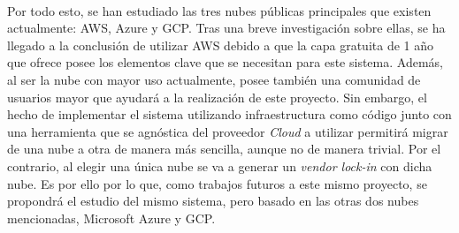 \documentclass[../../memoria.tex]{subfiles}
\begin{document}
\paragraph{}
Por todo esto, se han estudiado las tres nubes públicas principales que existen actualmente: AWS, Azure y GCP. Tras una breve investigación sobre ellas, se ha llegado a la conclusión de utilizar AWS debido a que la capa gratuita de 1 año que ofrece posee los elementos clave que se necesitan para este sistema. Además, al ser la nube con mayor uso actualmente, posee también una comunidad de usuarios mayor que ayudará a la realización de este proyecto. Sin embargo, el hecho de implementar el sistema utilizando infraestructura como código junto con una herramienta que se agnóstica del proveedor \textit{Cloud} a utilizar permitirá migrar de una nube a otra de manera más sencilla, aunque no de manera trivial. Por el contrario, al elegir una única nube se va a generar un \textit{vendor lock-in} con dicha nube. Es por ello por lo que, como trabajos futuros a este mismo proyecto, se propondrá el estudio del mismo sistema, pero basado en las otras dos nubes mencionadas, Microsoft Azure y GCP.
\end{document}
